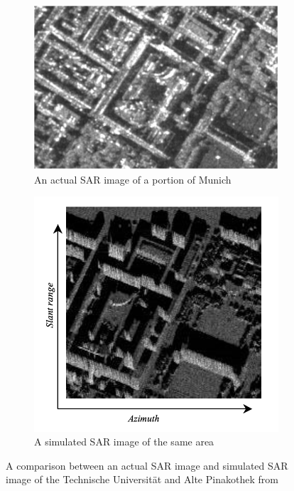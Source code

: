 \begin{figure}
\end{figure}

\begin{figure}
\centering
\begin{subfigure}{.5\textwidth}
	\centering
	\includegraphics[width=0.9\linewidth]{../figures/franceschetti_2007_munich_sar}
	\caption{An actual SAR image of a portion of Munich}
	\label{fig:franceschetti_2007_munich_sar}
\end{subfigure}%
\begin{subfigure}{.5\textwidth}
	\centering
	\includegraphics[width=0.9\linewidth]{../figures/franceschetti_2007_munich_sim}	
	\caption{A simulated SAR image of the same area}
	\label{fig:franceschetti_2007_munich_sim}
\end{subfigure}
\caption{A comparison between an actual SAR image and simulated SAR image of the Technische Universität and Alte Pinakothek from \cite{franceschettiSimulationToolsInterpretation2007}}
\label{fig:franceschetti_2007_munich}
	
\end{figure}

